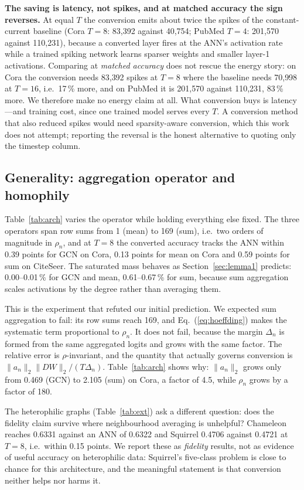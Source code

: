 \documentclass[10pt,twocolumn]{article}
\newcommand{\anorm}{\lVert a_{n}\rVert_{2}}
\newcommand{\rhon}{\rho_{n}}
\newcommand{\Deltan}{\Delta_{n}}
\newcommand{\tabref}[1]{Table~\ref{#1}}
\newcommand{\secref}[1]{Section~\ref{#1}}
\newcommand{\eqnref}[1]{Eq.~(\ref{#1})}
\begin{document}
\textbf{The saving is latency, not spikes, and at matched accuracy the sign reverses.} At equal
$T$ the conversion emits about twice the spikes of the constant-current baseline (Cora $T=8$:
83{,}392 against 40{,}754; PubMed $T=4$: 201{,}570 against 110{,}231), because a converted layer
fires at the ANN's activation rate while a trained spiking network learns sparser weights and
smaller layer-1 activations. Comparing at \emph{matched accuracy} does not rescue the energy
story: on Cora the conversion needs 83{,}392 spikes at $T=8$ where the baseline needs 70{,}998
at $T=16$, i.e.\ 17\,\% more, and on PubMed it is 201{,}570 against 110{,}231, 83\,\% more.
We therefore make no energy claim at all. What conversion buys is latency---and training cost,
since one trained model serves every $T$. A conversion method that also reduced spikes would
need sparsity-aware conversion, which this work does not attempt; reporting the reversal is the
honest alternative to quoting only the timestep column.

\subsection{Generality: aggregation operator and homophily}
\label{sec:generality}

\tabref{tab:arch} varies the operator while holding everything else fixed. The three operators span
row sums from 1 (mean) to 169 (sum), i.e.\ two orders of magnitude in $\rhon$, and at $T=8$ the
converted accuracy tracks the ANN within 0.39 points for GCN on Cora, 0.13 points for mean on Cora
and 0.59 points for sum on CiteSeer. The saturated mass behaves as \secref{sec:lemma1} predicts:
0.00--0.01\,\% for GCN and mean, 0.61--0.67\,\% for sum, because sum aggregation scales activations
by the degree rather than averaging them.

This is the experiment that refuted our initial prediction. We expected sum aggregation to fail:
its row sums reach 169, and \eqnref{eq:hoeffding} makes the systematic term proportional to $\rhon$.
It does not fail, because the margin $\Deltan$ is formed from the same aggregated logits and grows
with the same factor. The relative error is $\rho$-invariant, and the quantity that actually
governs conversion is $\anorm\lVert DW\rVert_{2}/(T\Deltan)$. \tabref{tab:arch} shows why:
$\anorm$ grows only from 0.469 (GCN) to 2.105 (sum) on Cora, a factor of 4.5, while $\rhon$ grows
by a factor of 180.

The heterophilic graphs (\tabref{tab:ext}) ask a different question: does the fidelity claim survive
where neighbourhood averaging is unhelpful? Chameleon reaches 0.6331 against an ANN of 0.6322 and
Squirrel 0.4706 against 0.4721 at $T=8$, i.e.\ within 0.15 points. We report these as
\emph{fidelity} results, not as evidence of useful accuracy on heterophilic data: Squirrel's
five-class problem is close to chance for this architecture, and the meaningful statement is that
conversion neither helps nor harms it.
\end{document}
